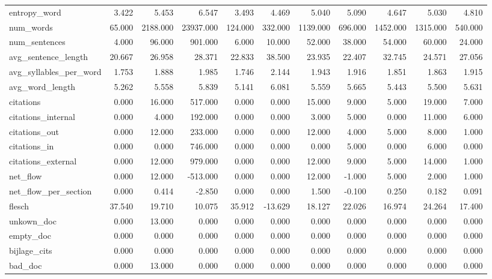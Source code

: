 \begin{tabular}{lrrrrrrrrrr}
\cline{1-11}
entropy\_word & 3.422 & 5.453 & 6.547 & 3.493 & 4.469 & 5.040 & 5.090 & 4.647 & 5.030 & 4.810 \\
\cline{1-11}
num\_words & 65.000 & 2188.000 & 23937.000 & 124.000 & 332.000 & 1139.000 & 696.000 & 1452.000 & 1315.000 & 540.000 \\
\cline{1-11}
num\_sentences & 4.000 & 96.000 & 901.000 & 6.000 & 10.000 & 52.000 & 38.000 & 54.000 & 60.000 & 24.000 \\
\cline{1-11}
avg\_sentence\_length & 20.667 & 26.958 & 28.371 & 22.833 & 38.500 & 23.935 & 22.407 & 32.745 & 24.571 & 27.056 \\
\cline{1-11}
avg\_syllables\_per\_word & 1.753 & 1.888 & 1.985 & 1.746 & 2.144 & 1.943 & 1.916 & 1.851 & 1.863 & 1.915 \\
\cline{1-11}
avg\_word\_length & 5.262 & 5.558 & 5.839 & 5.141 & 6.081 & 5.559 & 5.665 & 5.443 & 5.500 & 5.631 \\
\cline{1-11}
citations & 0.000 & 16.000 & 517.000 & 0.000 & 0.000 & 15.000 & 9.000 & 5.000 & 19.000 & 7.000 \\
\cline{1-11}
citations\_internal & 0.000 & 4.000 & 192.000 & 0.000 & 0.000 & 3.000 & 5.000 & 0.000 & 11.000 & 6.000 \\
\cline{1-11}
citations\_out & 0.000 & 12.000 & 233.000 & 0.000 & 0.000 & 12.000 & 4.000 & 5.000 & 8.000 & 1.000 \\
\cline{1-11}
citations\_in & 0.000 & 0.000 & 746.000 & 0.000 & 0.000 & 0.000 & 5.000 & 0.000 & 6.000 & 0.000 \\
\cline{1-11}
citations\_external & 0.000 & 12.000 & 979.000 & 0.000 & 0.000 & 12.000 & 9.000 & 5.000 & 14.000 & 1.000 \\
\cline{1-11}
net\_flow & 0.000 & 12.000 & -513.000 & 0.000 & 0.000 & 12.000 & -1.000 & 5.000 & 2.000 & 1.000 \\
\cline{1-11}
net\_flow\_per\_section & 0.000 & 0.414 & -2.850 & 0.000 & 0.000 & 1.500 & -0.100 & 0.250 & 0.182 & 0.091 \\
\cline{1-11}
flesch & 37.540 & 19.710 & 10.075 & 35.912 & -13.629 & 18.127 & 22.026 & 16.974 & 24.264 & 17.400 \\
\cline{1-11}
unkown\_doc & 0.000 & 13.000 & 0.000 & 0.000 & 0.000 & 0.000 & 0.000 & 0.000 & 0.000 & 0.000 \\
\cline{1-11}
empty\_doc & 0.000 & 0.000 & 0.000 & 0.000 & 0.000 & 0.000 & 0.000 & 0.000 & 0.000 & 0.000 \\
\cline{1-11}
bijlage\_cits & 0.000 & 0.000 & 0.000 & 0.000 & 0.000 & 0.000 & 0.000 & 0.000 & 0.000 & 0.000 \\
\cline{1-11}
bad\_doc & 0.000 & 13.000 & 0.000 & 0.000 & 0.000 & 0.000 & 0.000 & 0.000 & 0.000 & 0.000 \\
\cline{1-11}
\bottomrule
\end{tabular}
